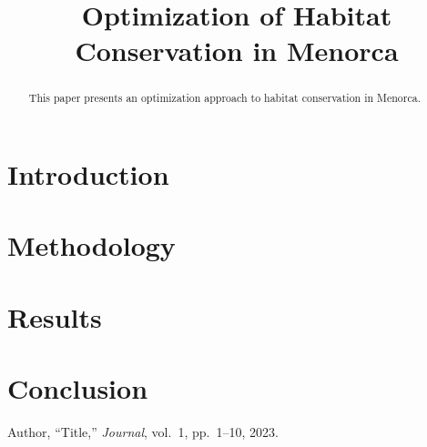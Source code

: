 \documentclass[conference]{IEEEtran}
\title{Optimization of Habitat Conservation in Menorca}
\author{
    \IEEEauthorblockN{Author Name}
    \IEEEauthorblockA{Institution}
}
\begin{document}
\maketitle

\begin{abstract}
    This paper presents an optimization approach to habitat conservation in Menorca.
\end{abstract}

\section{Introduction}

\section{Methodology}

\section{Results}

\section{Conclusion}

\begin{thebibliography}{99}

 Author, ``Title,'' \textit{Journal}, vol.~1, pp.~1--10, 2023.

\end{thebibliography}
\end{document}
